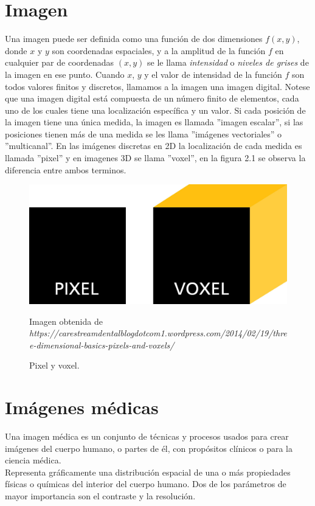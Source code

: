 \documentclass[12pt]{report}
\begin{document}
\section{Imagen}
Una imagen puede ser definida como una función de dos dimensiones $f(x, y)$, donde $x$ y $y$ son coordenadas espaciales, y a la amplitud de la función $f$ en cualquier par de coordenadas $(x, y)$ se le llama \textit{intensidad} o \textit{niveles de grises} de la imagen en ese punto. Cuando $x$, $y$ y el valor de intensidad de la función $f$ son todos valores finitos y discretos, llamamos a la imagen una imagen digital. Notese que una imagen digital está compuesta de un número finito de elementos, cada uno de los cuales tiene una localización específica y un valor. Si cada posición de la imagen tiene una única medida, la imagen es llamada ''imagen escalar'', si las posiciones tienen más de una medida se les llama ''imágenes vectoriales'' o ''multicanal''. En las imágenes discretas en 2D la localización de cada medida es llamada ''pixel'' y en imagenes 3D se llama ''voxel'', en la figura 2.1 se observa la diferencia entre ambos terminos. \cite{metodos} \cite{imag}

\begin{figure}[H]
\centering
\includegraphics[width = 5 cm, height = 3 cm]{pixel}
\caption{Pixel y voxel.}
Imagen obtenida de \textit{https://carestreamdentalblogdotcom1.wordpress.com/2014/02/19/three-dimensional-basics-pixels-and-voxels/}
\end{figure}

\section{Imágenes médicas}
Una imagen médica es un conjunto de técnicas y procesos usados para crear imágenes del cuerpo humano, o partes de él, con propósitos clínicos  o para la ciencia médica.\\

Representa gráficamente una distribución espacial de una o más propiedades físicas o químicas del interior del cuerpo humano. Dos de los parámetros de mayor importancia son el contraste y la resolución. \\
\end{document}
